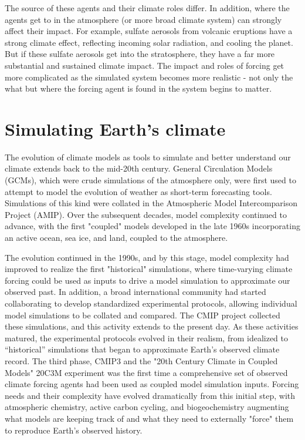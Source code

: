 \documentclass[gmd, preprint]{copernicus}
\begin{document}
The source of these agents and their climate roles differ. In addition, where the agents get to in the atmosphere (or more broad climate system) can strongly affect their impact. For example, sulfate aerosols from volcanic eruptions have a strong climate effect, reflecting incoming solar radiation, and cooling the planet. But if these sulfate aerosols get into the stratosphere, they have a far more substantial and sustained climate impact. The impact and roles of forcing get more complicated as the simulated system becomes more realistic - not only the what but where the forcing agent is found in the system begins to matter.


\section{Simulating Earth’s climate}

The evolution of climate models as tools to simulate and better understand our climate extends back to the mid-20th century. General Circulation Models (GCMs), which were crude simulations of the atmosphere only, were first used to attempt to model the evolution of weather as short-term forecasting tools. Simulations of this kind were collated in the Atmospheric Model Intercomparison Project (AMIP). Over the subsequent decades, model complexity continued to advance, with the first "coupled" models developed in the late 1960s incorporating an active ocean, sea ice, and land, coupled to the atmosphere.

The evolution continued in the 1990s, and by this stage, model complexity had improved to realize the first "historical" simulations, where time-varying climate forcing could be used as inputs to drive a model simulation to approximate our observed past. In addition, a broad international community had started collaborating to develop standardized experimental protocols, allowing individual model simulations to be collated and compared. The CMIP project collected these simulations, and this activity extends to the present day. As these activities matured, the experimental protocols evolved in their realism, from idealized to “historical” simulations that began to approximate Earth’s observed climate record. The third phase, CMIP3 and the "20th Century Climate in Coupled Models" 20C3M experiment was the first time a comprehensive set of observed climate forcing agents had been used as coupled model simulation inputs. Forcing needs and their complexity have evolved dramatically from this initial step, with atmospheric chemistry, active carbon cycling, and biogeochemistry augmenting what models are keeping track of and what they need to externally "force" them to reproduce Earth’s observed history.
\end{document}
